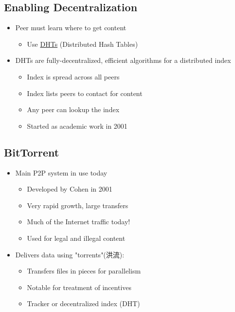 \documentclass[12pt]{ctexart}   %
\begin{document}
	\subsection{Enabling Decentralization}
	\begin{itemize}
		\item Peer must learn where to get content
		\begin{itemize}
			\item Use \underline{DHTs} (Distributed Hash Tables)
		\end{itemize}
		
		\item DHTs are fully-decentralized, efficient algorithms for a distributed index
		\begin{itemize}
			\item Index is spread across all peers
			\item Index lists peers to contact for content
			\item Any peer can lookup the index
			\item Started as academic work in 2001
		\end{itemize}
	\end{itemize}
	
	\subsection{BitTorrent}
	\begin{itemize}
		\item Main P2P system in use today
		\begin{itemize}
			\item Developed by Cohen in 2001
			\item Very rapid growth, large transfers
			\item Much of the Internet traffic today!
			\item Used for legal and illegal content
		\end{itemize}
		
		\item Delivers data using "torrents"(洪流):
		\begin{itemize}
			\item Transfers files in pieces for parallelism
			\item Notable for treatment of incentives
			\item Tracker or decentralized index (DHT)
		\end{itemize}
	\end{itemize}
	
\end{document}
